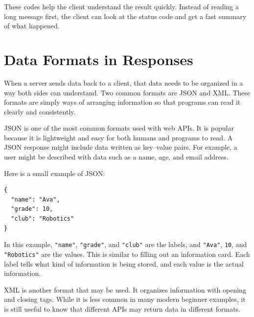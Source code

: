 These codes help the client understand the result quickly. Instead of
reading a long message first, the client can look at the status code
and get a fast summary of what happened.


\section{Data Formats in Responses}

When a server sends data back to a client, that data needs to be
organized in a way both sides can understand. Two common formats are
JSON and XML. These formats are simply ways of arranging information
so that programs can read it clearly and consistently.

JSON is one of the most common formats used with web APIs. It is
popular because it is lightweight and easy for both humans and
programs to read. A JSON response might include data written as
key--value pairs. For example, a user might be described with data
such as a name, age, and email address.

Here is a small example of JSON:

\begin{verbatim}
{
  "name": "Ava",
  "grade": 10,
  "club": "Robotics"
}
\end{verbatim}

In this example, \texttt{"name"}, \texttt{"grade"}, and \texttt{"club"}
are the labels, and \texttt{"Ava"}, \texttt{10}, and
\texttt{"Robotics"} are the values. This is similar to filling out an
information card. Each label tells what kind of information is being
stored, and each value is the actual information.

XML is another format that may be used. It organizes information with
opening and closing tags. While it is less common in many modern
beginner examples, it is still useful to know that different APIs may
return data in different formats.
